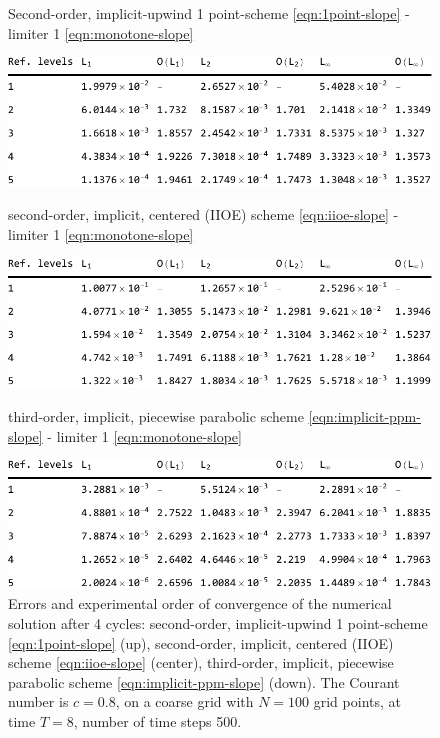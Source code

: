 \documentclass[../thesis.tex]{subfiles}
\begin{document}
\begin{figure}[H]
	\centering
    \caption*{Second-order, implicit-upwind 1 point-scheme \eqref{eqn:1point-slope} - limiter 1 \eqref{eqn:monotone-slope}}
	\includegraphics[width=\textwidth]{../tab/tab-1point-c0p8-T8-limit1-smooth.pdf}
    \caption*{second-order, implicit, centered (IIOE) scheme \eqref{eqn:iioe-slope} - limiter 1 \eqref{eqn:monotone-slope}}
	\includegraphics[width=\textwidth]{../tab/tab-iioe-c0p8-T8-limit1-smooth.pdf}
    \caption*{third-order, implicit, piecewise parabolic scheme \eqref{eqn:implicit-ppm-slope} - limiter 1 \eqref{eqn:monotone-slope}}
	\includegraphics[width=\textwidth]{../tab/tab-implicit-ppm-c0p8-T8-limit1-smooth.pdf}
	\caption{Errors and experimental order of convergence of the numerical solution after 4 cycles: second-order, implicit-upwind 1 point-scheme \eqref{eqn:1point-slope} (up), second-order, implicit, centered (IIOE) scheme \eqref{eqn:iioe-slope} (center), third-order, implicit, piecewise parabolic scheme \eqref{eqn:implicit-ppm-slope} (down). The Courant number is \(c = 0.8\), on a coarse grid with \(N = 100\) grid points, at time \(T = 8\), number of time steps 500.}
	\label{tab:c0p8-T8-limit1-smooth}
\end{figure}
\end{document}

